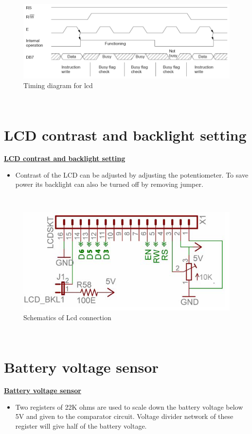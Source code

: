 \documentclass[a4paper,12pt,oneside]{book}
\begin{document}
	\hfill\\
	\begin{figure}[h!]
		\caption{Timing diagram for lcd}
		\includegraphics[width=\textwidth]{./HardwareManual/lcd_timing_diagram.png}
	\end{figure}	
	\hfill\\
	\newpage
	
	\chapter[LCD contrast and backlight setting]{LCD contrast and backlight setting}
	\underline{\textbf{\Large{LCD contrast and backlight setting}}}
	\begin{itemize}
	\item{Contrast of the LCD can be adjusted by adjusting the potentiometer. To save power its backlight can also be turned off by removing jumper.}
	\end{itemize}
	
	\hfill\\
	\begin{figure}[h!]
		\caption{Schematics of Lcd connection}
		\includegraphics[width=\textwidth]{./HardwareManual/lcd_connection.png}
	\end{figure}	
	\hfill\\
	\newpage
	
		\chapter[Battery voltage sensor]{Battery voltage sensor}
	\underline{\textbf{\Large{Battery voltage sensor}}}
	\begin{itemize}
		\item{Two registers of 22K ohms are used to scale down the battery voltage below 5V and given to the
			comparator circuit. Voltage divider network of these register will give half of the
			battery voltage.}
	\end{itemize}
\end{document}
